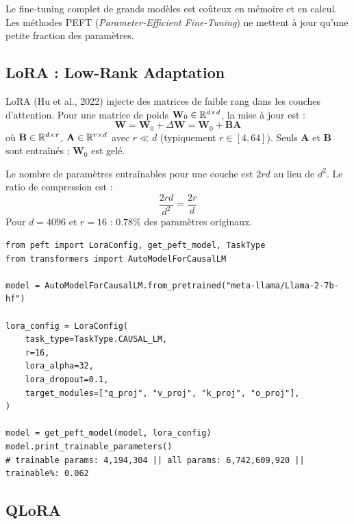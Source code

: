 Le fine-tuning complet de grands mod\`eles est co\^uteux en m\'emoire et en
calcul. Les m\'ethodes PEFT (\emph{Parameter-Efficient Fine-Tuning}) ne mettent
\`a jour qu'une petite fraction des param\`etres.

\subsection{LoRA : Low-Rank Adaptation}

\begin{definition}[LoRA]
LoRA (Hu et al., 2022) injecte des matrices de faible rang dans les couches
d'attention. Pour une matrice de poids $\mathbf{W}_0 \in \mathbb{R}^{d \times d}$,
la mise \`a jour est :
\[
\mathbf{W} = \mathbf{W}_0 + \Delta \mathbf{W} = \mathbf{W}_0 + \mathbf{B}\mathbf{A}
\]
o\`u $\mathbf{B} \in \mathbb{R}^{d \times r}$, $\mathbf{A} \in \mathbb{R}^{r \times d}$ avec
$r \ll d$ (typiquement $r \in [4, 64]$). Seuls $\mathbf{A}$ et $\mathbf{B}$
sont entra\^in\'es ; $\mathbf{W}_0$ est gel\'e.
\end{definition}

\begin{proposition}
Le nombre de param\`etres entra\^inables pour une couche est $2rd$ au lieu
de $d^2$. Le ratio de compression est :
\[
\frac{2rd}{d^2} = \frac{2r}{d}
\]
Pour $d = 4096$ et $r = 16$ : $0.78\%$ des param\`etres originaux.
\end{proposition}

\begin{codeblock}[title=\textbf{LoRA avec PEFT}]
\begin{verbatim}
from peft import LoraConfig, get_peft_model, TaskType
from transformers import AutoModelForCausalLM

model = AutoModelForCausalLM.from_pretrained("meta-llama/Llama-2-7b-hf")

lora_config = LoraConfig(
    task_type=TaskType.CAUSAL_LM,
    r=16,
    lora_alpha=32,
    lora_dropout=0.1,
    target_modules=["q_proj", "v_proj", "k_proj", "o_proj"],
)

model = get_peft_model(model, lora_config)
model.print_trainable_parameters()
# trainable params: 4,194,304 || all params: 6,742,609,920 || trainable%: 0.062
\end{verbatim}
\end{codeblock}

\subsection{QLoRA}

